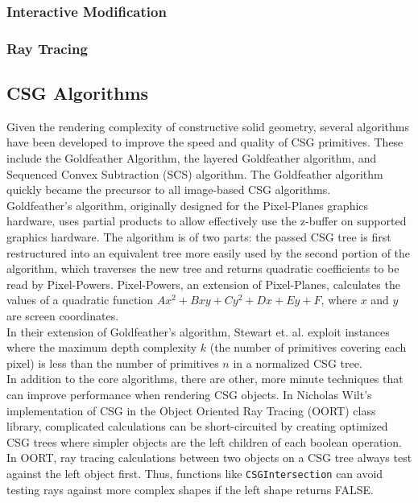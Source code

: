 \documentclass[12pt]{article}
\begin{document}
\begin{doublespace}
\subsubsection{Interactive Modification}
\subsubsection{Ray Tracing}
\subsection{CSG Algorithms}
Given the rendering complexity of constructive solid geometry, several algorithms have been developed to improve the speed and quality of CSG primitives. These include the Goldfeather Algorithm, the layered Goldfeather algorithm, and Sequenced Convex Subtraction (SCS) algorithm. The Goldfeather algorithm quickly became the precursor to all image-based CSG algorithms\cite{hardware_csg}.\\

Goldfeather's algorithm, originally designed for the Pixel-Planes graphics hardware, uses partial products to allow effectively use the z-buffer on supported graphics hardware\cite{hardware_csg}. The algorithm is of two parts: the passed CSG tree is first restructured into an equivalent tree more easily used by the second portion of the algorithm, which traverses the new tree and returns quadratic coefficients to be read by Pixel-Powers\cite{gold}. Pixel-Powers, an extension of Pixel-Planes, calculates the values of a quadratic function $Ax^2 + Bxy + Cy^2 + Dx + Ey + F$, where $x$ and $y$ are screen coordinates. \\

In their extension of Goldfeather's algorithm, Stewart et. al. exploit instances where the maximum depth complexity $k$ (the number of primitives covering each pixel) is less than the number of primitives $n$ in a normalized CSG tree\cite{layered_gold}.\\

In addition to the core algorithms, there are other, more minute techniques that can improve performance when rendering CSG objects. In Nicholas Wilt's implementation of CSG in the Object Oriented Ray Tracing (OORT) class library, complicated calculations can be short-circuited by creating optimized CSG trees where simpler objects are the left children of each boolean operation. In OORT, ray tracing calculations between two objects on a CSG tree always test against the left object first. Thus, functions like \texttt{CSGIntersection} can avoid testing rays against more complex shapes if the left shape returns FALSE\cite{raytrace}.

\end{doublespace}
\end{document}
